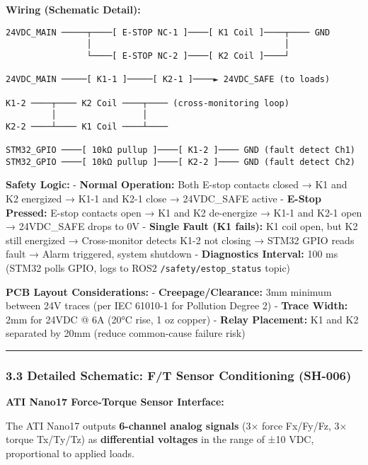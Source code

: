 \documentclass[
]{article}
\begin{document}
\textbf{Wiring (Schematic Detail):}

\begin{verbatim}
24VDC_MAIN ─────┬────[ E-STOP NC-1 ]────[ K1 Coil ]────┬──── GND
                │                                      │
                └────[ E-STOP NC-2 ]────[ K2 Coil ]────┘

24VDC_MAIN ─────[ K1-1 ]─────[ K2-1 ]────► 24VDC_SAFE (to loads)

K1-2 ────┬──── K2 Coil ────┬──── (cross-monitoring loop)
         │                 │
K2-2 ────┴──── K1 Coil ────┴────

STM32_GPIO ────[ 10kΩ pullup ]────[ K1-2 ]──── GND (fault detect Ch1)
STM32_GPIO ────[ 10kΩ pullup ]────[ K2-2 ]──── GND (fault detect Ch2)
\end{verbatim}

\textbf{Safety Logic:} - \textbf{Normal Operation:} Both E-stop contacts
closed → K1 and K2 energized → K1-1 and K2-1 close → 24VDC\_SAFE active
- \textbf{E-Stop Pressed:} E-stop contacts open → K1 and K2 de-energize
→ K1-1 and K2-1 open → 24VDC\_SAFE drops to 0V - \textbf{Single Fault
(K1 fails):} K1 coil open, but K2 still energized → Cross-monitor
detects K1-2 not closing → STM32 GPIO reads fault → Alarm triggered,
system shutdown - \textbf{Diagnostics Interval:} 100 ms (STM32 polls
GPIO, logs to ROS2 \texttt{/safety/estop\_status} topic)

\textbf{PCB Layout Considerations:} - \textbf{Creepage/Clearance:} 3mm
minimum between 24V traces (per IEC 61010-1 for Pollution Degree 2) -
\textbf{Trace Width:} 2mm for 24VDC @ 6A (20°C rise, 1 oz copper) -
\textbf{Relay Placement:} K1 and K2 separated by 20mm (reduce
common-cause failure risk)

\begin{center}\rule{0.5\linewidth}{0.5pt}\end{center}

\hypertarget{detailed-schematic-ft-sensor-conditioning-sh-006}{%
\subsubsection{3.3 Detailed Schematic: F/T Sensor Conditioning
(SH-006)}\label{detailed-schematic-ft-sensor-conditioning-sh-006}}

\textbf{ATI Nano17 Force-Torque Sensor Interface:}

The ATI Nano17 outputs \textbf{6-channel analog signals} (3× force
Fx/Fy/Fz, 3× torque Tx/Ty/Tz) as \textbf{differential voltages} in the
range of ±10 VDC, proportional to applied loads.
\end{document}
